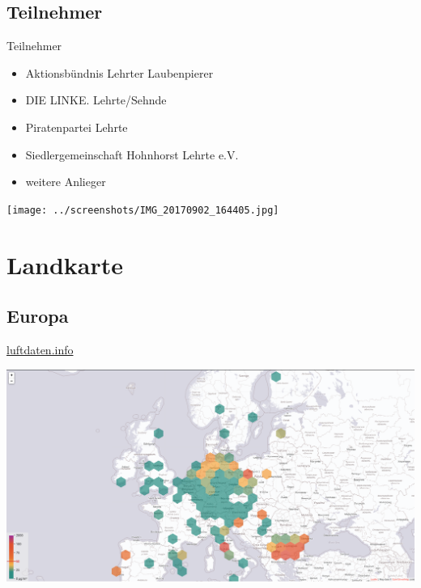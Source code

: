 \documentclass[aspectratio=169]{beamer} %
\begin{document}
\subsection{Teilnehmer}
\begin{frame}{Teilnehmer}
  \begin{itemize}
  \item Aktionsbündnis Lehrter Laubenpierer
  \item DIE LINKE. Lehrte/Sehnde
  \item Piratenpartei Lehrte
  \item Siedlergemeinschaft Hohnhorst Lehrte e.V.
  \item weitere Anlieger
  \end{itemize}
  \begin{center}
    \texttt{[image: ../screenshots/IMG\_20170902\_164405.jpg]}
  \end{center}
\end{frame}

\section{Landkarte}
\subsection{Europa}
\begin{frame}{\href{http://hannover.maps.luftdaten.info/\#5/52.373/10.005}{luftdaten.info}}
  \begin{center}
    \includegraphics[width=\textwidth]{../screenshots/luftdaten-zoom-e.png}
  \end{center}
\end{frame}
\end{document}
